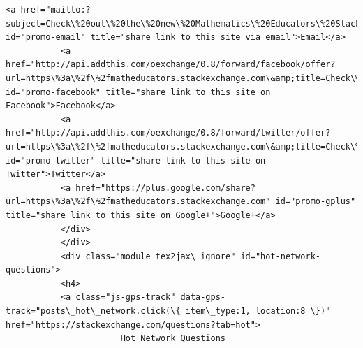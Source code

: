\documentclass[11pt]{article}
\begin{document}
\begin{Verbatim}[commandchars=\\\{\}]
           <a href="mailto:?subject=Check\%20out\%20the\%20new\%20Mathematics\%20Educators\%20Stack\%20Exchange\%20Q\%26A\%20site\%20from\%20Stack\%20Exchange\&amp;body=Hi!\%0d\%0a\%0d\%0aI\%27m\%20supporting\%20a\%20new\%20Q\%26A\%20website\%20for\%20those\%20involved\%20in\%20the\%20field\%20of\%20teaching\%20mathematics.\%0d\%0a\%0d\%0aIt\%27s\%20built\%20on\%20the\%20same\%20software\%20as\%20stackoverflow.com\%2c\%20a\%20hugely\%20popular\%20site\%20where\%20over\%20seven\%20million\%20programmers\%20help\%20each\%20other\%20with\%20difficult\%20programming\%20problems.\%20On\%20Stack\%20Overflow\%20the\%20audience\%20votes\%20for\%20the\%20best\%20answer\%2c\%20so\%20the\%20answer\%20you\%20want\%20is\%20usually\%20right\%20at\%20the\%20top\%2c\%20not\%20on\%20page\%20five.\%0d\%0a\%0d\%0aI\%27m\%20hoping\%20that\%20a\%20site\%20for\%20those\%20involved\%20in\%20the\%20field\%20of\%20teaching\%20mathematics\%20would\%20have\%20the\%20same\%20kind\%20of\%20network\%20effect\%20and\%20turn\%20into\%20an\%20amazing\%20resource.\%0d\%0a\%0d\%0aThe\%20public\%20beta\%20is\%20going\%20on\%20here\%2c\%20if\%20you\%27re\%20interested\%20in\%20participating\%3a\%0d\%0a\%0d\%0ahttps\%3a\%2f\%2fmatheducators.stackexchange.com\%0d\%0a\%0d\%0aThanks!" id="promo-email" title="share link to this site via email">Email</a>
           <a href="http://api.addthis.com/oexchange/0.8/forward/facebook/offer?url=https\%3a\%2f\%2fmatheducators.stackexchange.com\&amp;title=Check\%20out\%20the\%20new\%20Mathematics\%20Educators\%20Stack\%20Exchange\%20Q\%26A\%20site\%20from\%20Stack\%20Exchange\&amp;username=stackoverflow" id="promo-facebook" title="share link to this site on Facebook">Facebook</a>
           <a href="http://api.addthis.com/oexchange/0.8/forward/twitter/offer?url=https\%3a\%2f\%2fmatheducators.stackexchange.com\&amp;title=Check\%20out\%20the\%20new\%20Mathematics\%20Educators\%20Stack\%20Exchange\%20QnA\%20site\%20from\%20\%40StackExchange\&amp;username=stackoverflow\&amp;template=\%7B\%7Btitle\%7D\%7D\%20\%7B\%7Burl\%7D\%7D" id="promo-twitter" title="share link to this site on Twitter">Twitter</a>
           <a href="https://plus.google.com/share?url=https\%3a\%2f\%2fmatheducators.stackexchange.com" id="promo-gplus" title="share link to this site on Google+">Google+</a>
           </div>
           </div>
           <div class="module tex2jax\_ignore" id="hot-network-questions">
           <h4>
           <a class="js-gps-track" data-gps-track="posts\_hot\_network.click(\{ item\_type:1, location:8 \})" href="https://stackexchange.com/questions?tab=hot">
                       Hot Network Questions

\end{Verbatim}
\end{document}

